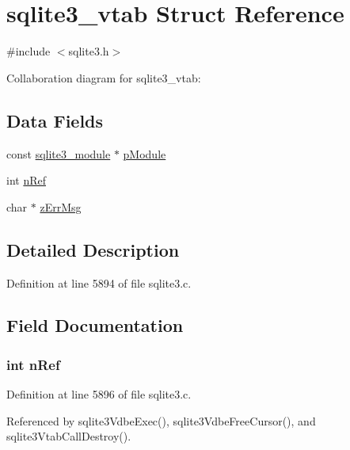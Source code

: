 \hypertarget{structsqlite3__vtab}{}\section{sqlite3\+\_\+vtab Struct Reference}
\label{structsqlite3__vtab}


{\ttfamily \#include $<$sqlite3.\+h$>$}



Collaboration diagram for sqlite3\+\_\+vtab\+:
\subsection*{Data Fields}
\begin{DoxyCompactItemize}
\item 
const \hyperlink{structsqlite3__module}{sqlite3\+\_\+module} $\ast$ \hyperlink{structsqlite3__vtab_a68871c21cfdca68ce4a92d7ff3395ce0}{p\+Module}
\item 
int \hyperlink{structsqlite3__vtab_a3c459f9ae278c22b72583c55ca01acb7}{n\+Ref}
\item 
char $\ast$ \hyperlink{structsqlite3__vtab_a80b3fc7c10851d42f781fa205fe68c17}{z\+Err\+Msg}
\end{DoxyCompactItemize}


\subsection{Detailed Description}


Definition at line 5894 of file sqlite3.\+c.



\subsection{Field Documentation}
\hypertarget{structsqlite3__vtab_a3c459f9ae278c22b72583c55ca01acb7}{}
\subsubsection[{n\+Ref}]{\setlength{\rightskip}{0pt plus 5cm}int n\+Ref}\label{structsqlite3__vtab_a3c459f9ae278c22b72583c55ca01acb7}


Definition at line 5896 of file sqlite3.\+c.



Referenced by sqlite3\+Vdbe\+Exec(), sqlite3\+Vdbe\+Free\+Cursor(), and sqlite3\+Vtab\+Call\+Destroy().

